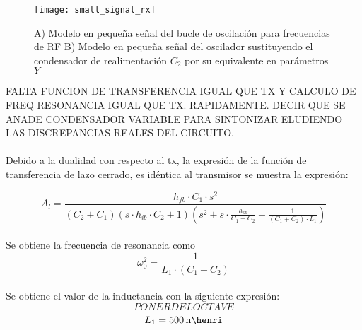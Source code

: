 \begin{figure}[h]
    \centering
    \texttt{[image: small\_signal\_rx]}
    \caption{A) Modelo en pequeña señal del bucle de oscilación para frecuencias de RF B) Modelo en pequeña señal del oscilador sustituyendo el condensador de realimentación $C_2$ por su equivalente en parámetros $Y$}
    \label{fig:ss_rx}
\end{figure}

FALTA FUNCION DE TRANSFERENCIA IGUAL QUE TX Y CALCULO DE FREQ RESONANCIA IGUAL QUE TX. RAPIDAMENTE. DECIR QUE SE ANADE CONDENSADOR VARIABLE PARA SINTONIZAR ELUDIENDO LAS DISCREPANCIAS REALES DEL CIRCUITO.
\paragraph{}
Debido a la dualidad con respecto al tx, la expresión de la función de transferencia de lazo cerrado, es idéntica al transmisor se muestra la expresión:

\begin{equation}
   \label{eq:Al_tx}
   A_l = \frac{h_{fb} \cdot C_1 \cdot s^2}{ \left( C_2+C_1 \right) \left( s \cdot h_{ib} \cdot C_2 + 1\right) \left( s^2 + s \cdot \frac{h_{ob}}{C_1 + C_2} + \frac{1}{(C_1 + C_2)\cdot L_1}\right) }
\end{equation}

\paragraph{}
Se obtiene la frecuencia de resonancia como $$\omega_0^2 = \frac{1}{L_1 \cdot (C_1 + C_2)}$$
\paragraph{}
Se obtiene el valor de la inductancia con la siguiente expresi\'on:
\begin{equation}
	\label{eq:inductance}
PONER DEL OCTAVE
\end{equation}
$$ L_1 = \SI{500}{\nano\henri} $$


